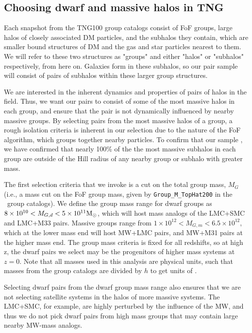 \documentclass[twocolumn]{aastex631}
\begin{document}
    \subsection{Choosing dwarf and massive halos in TNG} \label{sec:methods-halos}
    Each snapshot from the TNG100 group catalogs consist of FoF groups, large halos of closely associated DM particles, and the subhalos they contain, which are smaller bound structures of DM and the gas and star particles nearest to them. 
    We will refer to these two structures as "groups" and either "halos" or "subhalos" respectively, from here on. 
    Galaxies form in these subhalos, so our pair sample will consist of pairs of subhalos within these larger group structures.

    We are interested in the inherent dynamics and properties of pairs of halos in the field.
    Thus, we want our pairs to consist of some of the most massive halos in each group, and ensure that the pair is not dynamically influenced by nearby massive groups. 
    By selecting pairs from the most massive halos of a group, a rough isolation criteria is inherent in our selection due to the nature of the FoF algorithm, which groups together nearby particles. 
    To confirm that our sample , we have confirmed that nearly 100\% of the the most massive subhalos in each group are outside of the Hill radius of any nearby group or subhalo with greater mass.

    The first selection criteria that we invoke is a cut on the total group mass, $M_{G}$ (i.e., a mass cut on the FoF group mass, given by \texttt{Group\_M\_TopHat200} in the \tng\ group catalogs). 
    We define the group mass range for dwarf groups as $8\times 10^{10} < M_{G,d} < 5\times 10^{11}\mathrm{M}_\odot$, which will host mass analogs of the LMC+SMC and LMC+M33 pairs. 
    Massive groups range from $1\times10^{12} < M_{G,m} < 6.5\times10^{12}$, which at the lower mass end will host MW+LMC pairs, and MW+M31 pairs at the higher mass end. 
    The group mass criteria is fixed for all redshifts, so at high z, the dwarf pairs we select may be the progenitors of higher mass systems at $z=0$.
    Note that all masses used in this analysis are physical units, such that masses from the group catalogs are divided by $h$ to get units of \Msun. 

    Selecting dwarf pairs from the dwarf group mass range also ensures that we are not selecting satellite systems in the halos of more massive systems. 
    The LMC+SMC, for example, are highly perturbed by the influence of the MW, and thus we do not pick dwarf pairs from high mass groups that may contain large nearby MW-mass analogs.
    
\end{document}

